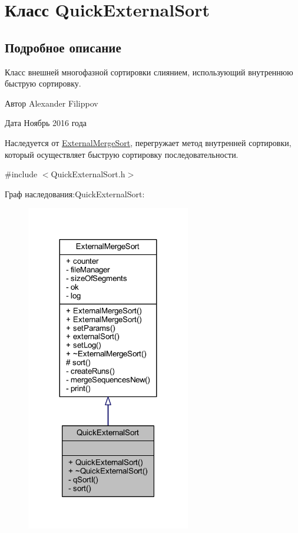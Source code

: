 \hypertarget{class_quick_external_sort}{}\section{Класс Quick\+External\+Sort}
\label{class_quick_external_sort}


\subsection{Подробное описание}
Класс внешней многофазной сортировки слиянием, использующий внутреннюю быструю сортировку. 

\begin{DoxyAuthor}{Автор}
Alexander Filippov 
\end{DoxyAuthor}
\begin{DoxyDate}{Дата}
Ноябрь 2016 года
\end{DoxyDate}
Наследуется от \hyperlink{class_external_merge_sort}{External\+Merge\+Sort}, перегружает метод внутренней сортировки, который осуществляет быструю сортировку последовательности. 

{\ttfamily \#include $<$Quick\+External\+Sort.\+h$>$}



Граф наследования\+:Quick\+External\+Sort\+:\nopagebreak
\begin{figure}[H]
\begin{center}
\leavevmode
\includegraphics[width=203pt]{class_quick_external_sort__inherit__graph}
\end{center}
\end{figure}


